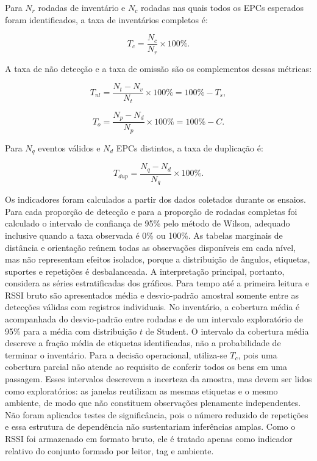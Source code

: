 Para $N_r$ rodadas de inventário e $N_c$ rodadas nas quais todos os EPCs esperados foram identificados, a taxa de inventários completos é:

\begin{equation}
    T_c = \frac{N_c}{N_r}\times 100\%.
    \label{eq:taxa-inventarios-completos}
\end{equation}

A taxa de não detecção e a taxa de omissão são os complementos dessas métricas:

\begin{equation}
    T_{nl} = \frac{N_t-N_v}{N_t}\times 100\% = 100\%-T_s,
    \label{eq:taxa-nao-leitura}
\end{equation}

\begin{equation}
    T_o = \frac{N_p-N_d}{N_p}\times 100\% = 100\%-C.
    \label{eq:taxa-omissao}
\end{equation}

Para $N_q$ eventos válidos e $N_d$ EPCs distintos, a taxa de duplicação é:

\begin{equation}
    T_{dup} = \frac{N_q-N_d}{N_q}\times 100\%.
    \label{eq:duplicacao}
\end{equation}

Os indicadores foram calculados a partir dos dados coletados durante os ensaios. Para cada proporção de detecção e para a proporção de rodadas completas foi calculado o intervalo de confiança de 95\% pelo método de Wilson, adequado inclusive quando a taxa observada é 0\% ou 100\%. As tabelas marginais de distância e orientação reúnem todas as observações disponíveis em cada nível, mas não representam efeitos isolados, porque a distribuição de ângulos, etiquetas, suportes e repetições é desbalanceada. A interpretação principal, portanto, considera as séries estratificadas dos gráficos. Para tempo até a primeira leitura e RSSI bruto são apresentados média e desvio-padrão amostral somente entre as detecções válidas com registros individuais. No inventário, a cobertura média é acompanhada do desvio-padrão entre rodadas e de um intervalo exploratório de 95\% para a média com distribuição $t$ de Student. O intervalo da cobertura média descreve a fração média de etiquetas identificadas, não a probabilidade de terminar o inventário. Para a decisão operacional, utiliza-se $T_c$, pois uma cobertura parcial não atende ao requisito de conferir todos os bens em uma passagem. Esses intervalos descrevem a incerteza da amostra, mas devem ser lidos como exploratórios: as janelas reutilizam as mesmas etiquetas e o mesmo ambiente, de modo que não constituem observações plenamente independentes. Não foram aplicados testes de significância, pois o número reduzido de repetições e essa estrutura de dependência não sustentariam inferências amplas. Como o RSSI foi armazenado em formato bruto, ele é tratado apenas como indicador relativo do conjunto formado por leitor, tag e ambiente.

